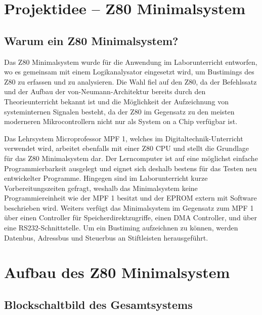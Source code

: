 \section{Projektidee -- Z80 Minimalsystem \cite{htl:res}}
\label{sec:z80-idee}
\subsection{Warum ein Z80 Minimalsystem?}
\label{sec:z80-warum}
Das Z80 Minimalsystem wurde für die Anwendung im Laborunterricht entworfen, wo es gemeinsam mit einem Logikanalysator eingesetzt wird, um Bustimings des Z80 zu erfassen und zu analysieren. Die Wahl fiel auf den Z80, da der Befehlssatz und der Aufbau der von-Neumann-Architektur bereits durch den Theorieunterricht bekannt ist und die Möglichkeit der Aufzeichnung von systeminternen Signalen besteht, da der Z80 im Gegensatz zu den meisten moderneren Mikrocontrollern nicht nur als System on a Chip verfügbar ist.

Das Lehrsystem Microprofessor MPF 1, welches im Digitaltechnik-Unterricht verwendet wird, arbeitet ebenfalls mit einer Z80 CPU und stellt die Grundlage für das Z80 Minimalsystem dar. Der Lerncomputer ist auf eine möglichst einfache Programmierbarkeit ausgelegt und eignet sich deshalb bestens für das Testen neu entwickelter Programme. Hingegen sind im Laborunterricht kurze Vorbereitungszeiten gefragt, weshalb das Minimalsystem keine Programmiereinheit wie der MPF 1 besitzt und der EPROM extern mit Software beschrieben wird. Weiters verfügt das Minimalsystem im Gegensatz zum MPF 1 über einen Controller für Speicherdirektzugriffe, einen DMA Controller, und über eine RS232-Schnittstelle. Um ein Bustiming aufzeichnen zu können, werden Datenbus, Adressbus und Steuerbus an Stiftleisten herausgeführt.

\section{Aufbau des Z80 Minimalsystem}
\label{sec:z80-aufbau}
\subsection{Blockschaltbild des Gesamtsystems}
\label{sec:z80-bsb}

